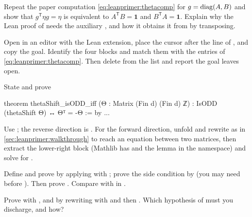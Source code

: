 \begin{exercise}\label{ex:leanprimer:basischange}
Repeat the paper computation \eqref{eq:leanprimer:thetacomp} for
$g=\operatorname{diag}(A,B)$ and show that $g^{\mathsf T}\eta g=\eta$ is equivalent to
$A^{\mathsf T}B=\mathbf 1$ and $B^{\mathsf T}A=\mathbf 1$. Explain why the Lean proof of
 needs the auxiliary , and how it
obtains it from  by transposing.
\end{exercise}

\begin{exercise}\label{ex:leanprimer:goals}
Open  in an editor with the Lean extension, place the cursor after the
 line of , and copy the goal. Identify the four blocks and
match them with the entries of \eqref{eq:leanprimer:thetacomp}. Then delete 
from the  list and report the goal  leaves open.
\end{exercise}

\begin{exercise}\label{ex:leanprimer:converse}
State and prove
\begin{leancode}
theorem thetaShift_isODD_iff (Θ : Matrix (Fin d) (Fin d) ℤ) :
    IsODD (thetaShift Θ) ↔ Θᵀ = -Θ := by ...
\end{leancode}
Use ; the reverse direction is
. For the forward direction, unfold and rewrite as in
\cref{sec:leanprimer:walkthrough} to reach an equation between two 
matrices, then extract the lower-right block (Mathlib has  and the
lemma  in the  namespace) and solve for
.
\end{exercise}

\begin{exercise}\label{ex:leanprimer:certificate2}
Define  and prove  by applying
 with ; prove the side condition
 by  (you may need
 before ). Then prove
. Compare with  in .
\end{exercise}

\begin{exercise}\label{ex:leanprimer:numbers2}
Prove  with , and
 by
rewriting with  and then . Which hypothesis of
 must you discharge, and how?
\end{exercise}

